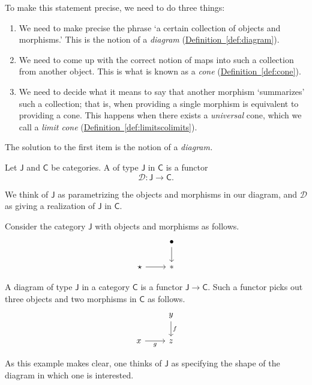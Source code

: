 \documentclass[notes.tex]{subfiles}
\begin{document}
To make this statement precise, we need to do three things:
\begin{enumerate}
  \item We need to make precise the phrase `a certain collection of objects and morphisms.' This is the notion of a \emph{diagram} (\hyperref[def:diagram]{Definition~\ref*{def:diagram}}).

  \item We need to come up with the correct notion of maps into such a collection from another object. This is what is known as a \emph{cone} (\hyperref[def:cone]{Definition~\ref*{def:cone}}).

  \item We need to decide what it means to say that another morphism `summarizes' such a collection; that is, when providing a single morphism is equivalent to providing a cone. This happens when there exists a \emph{universal} cone, which we call a \emph{limit cone} (\hyperref[def:limitscolimits]{Definition~\ref*{def:limitscolimits}}).
\end{enumerate}

The solution to the first item is the notion of a \emph{diagram.}

\begin{definition}[diagram]
  \label{def:diagram}
  Let $\mathsf{J}$ and $\mathsf{C}$ be categories. A  of type $\mathsf{J}$ in $\mathsf{C}$ is a functor
  \begin{equation*}
    \mathcal{D}\colon \mathsf{J} \rightarrow \mathsf{C}.
  \end{equation*}
\end{definition}

We think of $\mathsf{J}$ as parametrizing the objects and morphisms in our diagram, and $\mathcal{D}$ as giving a realization of $\mathsf{J}$ in $\mathsf{C}$.

\begin{example}
  Consider the category $\mathsf{J}$ with objects and morphisms as follows.
  \begin{equation*}
    \begin{tikzcd}
      & \bullet
      \arrow[d]
      \\
      \star
      \arrow[r]
      & *
    \end{tikzcd}
  \end{equation*}

  A diagram of type $\mathsf{J}$ in a category $\mathsf{C}$ is a functor $\mathsf{J} \to \mathsf{C}$. Such a functor picks out three objects and two morphisms in $\mathsf{C}$ as follows.
  \begin{equation*}
    \begin{tikzcd}
      & y
      \arrow[d, "f"]
      \\
      x
      \arrow[r, swap, "g"]
      & z
    \end{tikzcd}
  \end{equation*}

  As this example makes clear, one thinks of $\mathsf{J}$ as specifying the shape of the diagram in which one is interested.
\end{example}
\end{document}
